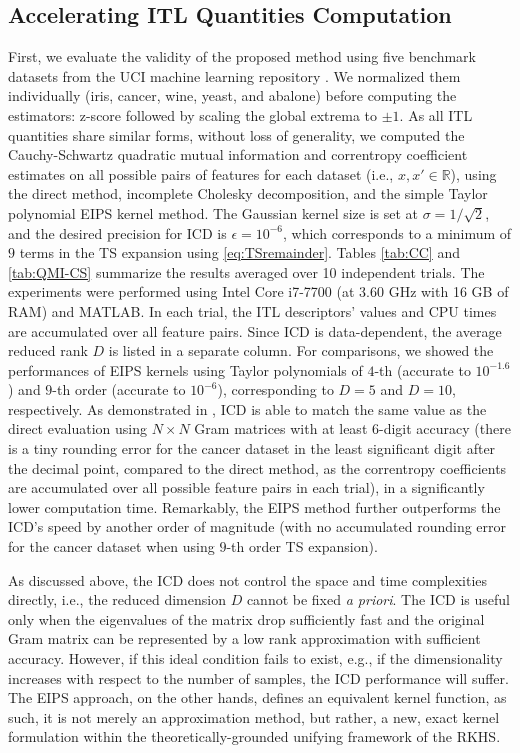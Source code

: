 \documentclass[8pt,twocolumn]{IEEEtran}
\newcommand{\R}{\mathbb{R}}
\begin{document}
\subsection{Accelerating ITL Quantities Computation}\label{Subsec:Accelerate}
First, we evaluate the validity of the proposed method using five benchmark datasets from the UCI machine learning repository \cite{UCI_data}. We normalized them individually (iris, cancer, wine, yeast, and abalone) before computing the estimators: z-score followed by scaling the global extrema to $\pm 1$. As all ITL quantities share similar forms, without loss of generality, we computed the Cauchy-Schwartz quadratic mutual information and correntropy coefficient estimates on all possible pairs of features for each dataset (i.e., $x,x'\in\R$), using the direct method, incomplete Cholesky decomposition, and the simple Taylor polynomial EIPS kernel method. The Gaussian kernel size is set at $\sigma = 1/\sqrt{2}$, and the desired precision for ICD is $\epsilon = 10^{-6}$, which corresponds to a minimum of $9$ terms in the TS expansion using \eqref{eq:TSremainder}. Tables \ref{tab:CC} and \ref{tab:QMI-CS} summarize the results averaged over 10 independent trials. The experiments were performed using Intel Core i7-7700 (at 3.60 GHz with 16 GB of RAM) and MATLAB. In each trial, the ITL descriptors' values and CPU times are accumulated over all feature pairs. Since ICD is data-dependent, the average reduced rank $D$ is listed in a separate column. For comparisons, we showed the performances of EIPS kernels using Taylor polynomials of $4$-th (accurate to $10^{-1.6}$) and $9$-th order (accurate to $10^{-6}$), corresponding to $D=5$ and $D = 10$, respectively. As demonstrated in \cite{Seth09}, ICD is able to match the same value as the direct evaluation using $N\times N$ Gram matrices with at least 6-digit accuracy (there is a tiny rounding error for the cancer dataset in the least significant digit after the decimal point, compared to the direct method, as the correntropy coefficients are accumulated over all possible feature pairs in each trial), in a significantly lower computation time. Remarkably, the EIPS method further outperforms the ICD's speed by another order of magnitude (with no accumulated rounding error for the cancer dataset when using $9$-th order TS expansion).

As discussed above, the ICD does not control the space and time complexities directly, i.e., the reduced dimension $D$ cannot be fixed \textit{a priori}. The ICD is useful only when the eigenvalues of the matrix drop sufficiently fast and the original Gram matrix can be represented by a low rank approximation with sufficient accuracy. However, if this ideal condition fails to exist, e.g., if the dimensionality increases with respect to the number of samples, the ICD performance will suffer. The EIPS approach, on the other hands, defines an equivalent kernel function, as such, it is not merely an approximation method, but rather, a new, exact kernel formulation within the theoretically-grounded unifying framework of the RKHS. 
\end{document}
